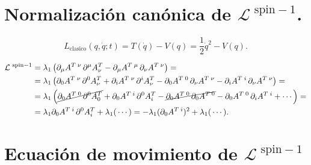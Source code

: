
\newpage
\section{Normalización canónica de $\mathcal{L}^{\text{ spin}-1}$.} \label{AppendixI:Normalizacion}


\begin{equation*}
	L_{\text{clasico}}(q, \dot{q}; t) = T(\dot{q}) - V(q) = \frac{1}{2} \dot{q}^{2} - V(q).
\end{equation*}


\begin{equation*}
\begin{split}
	\mathcal{L}^{\text{ spin}-1} &= 
	\lambda_{1}\left(\partial_{\mu}A^{T\;\nu}\,\partial^{\mu}A^{T}_{\nu} - \partial_{\mu}A^{T\;\mu}\,\partial_{\nu}A^{T\;\nu}\right) = \\
	&= \lambda_{1}\left(\partial_{0}A^{T\;\nu}\,\partial^{0}A^{T}_{\nu} + \partial_{i}A^{T\;\nu}\,\partial^{i}A^{T}_{\nu} - \partial_{0}A^{T\;0}\,\partial_{\nu}A^{T\;\nu} - \partial_{i}A^{T\;i}\,\partial_{\nu}A^{T\;\nu} \right) = \\
	&= \lambda_{1}\left(\cancel{\partial_{0}A^{T\;0}\,\partial^{0}A^{T}_{0}} + \partial_{0}A^{T\;i}\,\partial^{0}A^{T}_{i} - \cancel{\partial_{0}A^{T\;0}\,\partial_{0}A^{T\;0}} - \partial_{0}A^{T\;0}\,\partial_{i}A^{T\;i} + \cdots \right)  = \\
	&= \lambda_{1} \partial_{0}A^{T\;i}\,\partial^{0}A^{T}_{i} + \lambda_{1}(\,\cdots) =
	-\lambda_{1} (\partial_{0}A^{T\;i})^{2} + \lambda_{1}(\,\cdots).
\end{split}
\end{equation*}



\newpage
\section{Ecuación de movimiento de $\mathcal{L}^{\text{ spin}-1}$} \label{AppendixI:EoM}

